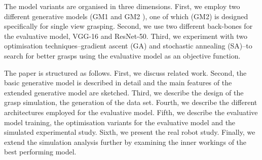 The model variants are organised in three dimensions. First, we employ two different generative models (GM1 \cite{kopicki2015ijrr} and GM2 \cite{kopicki2019ijrr}), one of which (GM2) is designed specifically for single view grasping. Second, we use two different back-bones for the evaluative model, VGG-16 and ResNet-50. Third, we experiment with two optimisation techniques--gradient ascent (GA) and stochastic annealing (SA)--to search for better grasps using the evaluative model as an objective function.



The paper is structured as follows. First, we discuss related work. Second, the basic generative model is described in detail and the main features of the extended generative model are sketched. Third, we describe the design of the grasp simulation, the generation of the data set. Fourth, we describe the different architectures employed for the evaluative model. Fifth, we describe the evaluative model training, the optimisation variants for the evaluative model and the simulated experimental study. Sixth, we present the real robot study. Finally, we extend the simulation analysis further by examining the inner workings of the best performing model.
